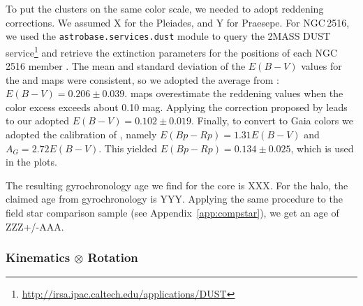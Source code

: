 \documentclass[12pt,twocolumn,tighten]{aastex63}
\begin{document}
To put the clusters on the same color scale, we needed to adopt
reddening corrections.
We assumed {X} for the Pleiades, and {Y} for Praesepe.
For NGC\,2516, we used the \texttt{astrobase.services.dust} module to
query the 2MASS DUST
service\footnote{\url{http://irsa.ipac.caltech.edu/applications/DUST}}
and retrieve the extinction parameters for the positions of each
NGC\,2516 member \citep{bhatti_astrobase_2018}.  The mean and standard
deviation of the $E(B-V)$ values for the \citet{schlegel_maps_1998}
and \citet{schlafly_measuring_2011} maps were consistent, so we
adopted the average from \citet{schlegel_maps_1998}:
$E(B-V)=0.206\pm0.039$.  \citet{bonifacio_search_2000}
\citet{schlegel_maps_1998} maps overestimate the reddening values when
the color excess exceeds about 0.10 mag. Applying the correction
proposed by \citet{bonifacio_search_2000} leads to our adopted
$E(B-V)=0.102\pm0.019$.  Finally, to convert to Gaia colors we adopted
the calibration of \citet{stassun_TIC8_2019}, namely $E(Bp-Rp)=1.31
E(B-V)$ and $A_G=2.72 E(B-V)$.  This yielded $E(Bp-Rp)=0.134\pm0.025$,
which is used in the plots.

The resulting gyrochronology age we find for the core is XXX.
For the halo, the claimed age from gyrochronology is YYY.
Applying the same procedure to the field star comparison sample (see
Appendix~\ref{app:compstar}),
we get an age of ZZZ+/-AAA.

\subsubsection{Kinematics $\otimes$ Rotation}
\end{document}

